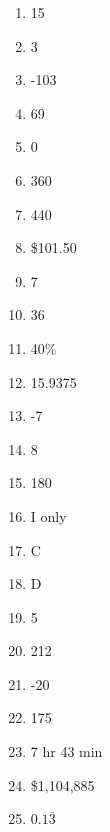 \documentclass[../uilmath.tex]{subfiles}
\begin{document}
\begin{enumerate}[label=\bfseries\arabic*.]
    \item %
    15

    \item %
    3

    \item %
    -103

    \item %
    69

    \item %
    0

    \item %
    360

    \item %
    440

    \item %
    \$101.50

    \item %
    7

    \item %
    36

    \item %
    40\%

    \item %
    15.9375

    \item %
    -7

    \item %
    8

    \item %
    180

    \item %
    I only 

    \item %
    C 

    \item %
    D 

    \item %
    5

    \item %
    212

    \item %
    -20

    \item %
    175

    \item %
    7 hr 43 min 

    \item %
    \$1,104,885

    \item %
    $0.1\overline{3}$


\end{enumerate}
\end{document}
